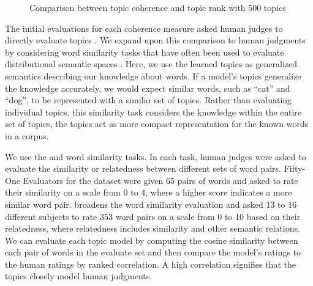 \begin{figure}[h!t!b!]
  \centering
  \caption{Comparison between topic coherence and topic rank with 500 topics}
  \label{fig:ranks500}
\end{figure}

The initial evaluations for each coherence measure asked human judges to
directly evaluate topics \cite{newman10uci,mimno11umass}.  We expand upon this
comparison to human judgments by considering word similarity tasks that have
often been used to evaluate distributional semantic spaces
\cite{jurgens10sspace}.  Here, we use the learned topics as generalized
semantics describing our knowledge about words.  If a model's topics generalize
the knowledge accurately, we would expect similar words, such as ``cat'' and
``dog'', to be represented with a similar set of topics.  Rather than evaluating
individual topics, this similarity task considers the knowledge within the
entire set of topics, the topics act as more compact representation for the
known words in a corpus.

We use the  and 
word similarity tasks.  In each task, human judges were asked to evaluate the
similarity or relatedness between different sets of word pairs.   Fifty-One
Evaluators for the  dataset were given 65 pairs of
words and asked to rate their similarity on a scale from 0 to 4, where a higher
score indicates a more similar word pair.  
broadens the word similarity evaluation and asked 13 to 16 different subjects
to rate 353 word pairs on a scale from 0 to 10 based on their relatedness, where
relatedness includes similarity and other semantic relations.  We can evaluate
each topic model by computing the cosine similarity between each pair of words
in the evaluate set and then compare the model's ratings to the human ratings by
ranked correlation.  A high correlation signifies that the topics closely model
human judgments.  

